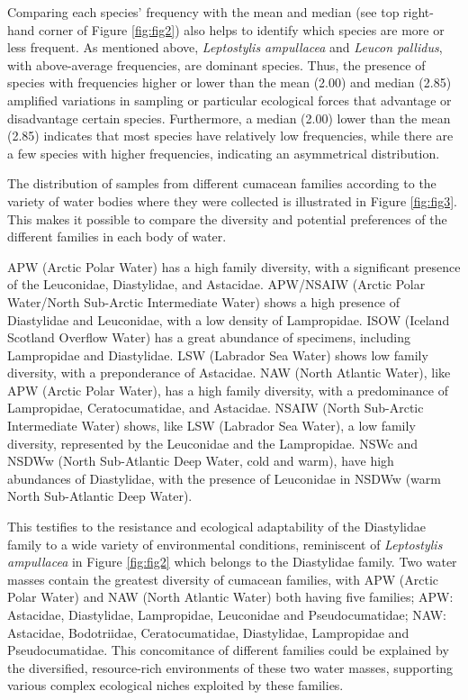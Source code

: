 Comparing each species’ frequency with the mean and median (see top right-hand corner of Figure \ref{fig:fig2}) also helps to identify which species are more or less frequent. As mentioned above, \emph{Leptostylis ampullacea} and \emph{Leucon pallidus}, with above-average frequencies, are dominant species. Thus, the presence of species with frequencies higher or lower than the mean (2.00) and median (2.85) amplified variations in sampling or particular ecological forces that advantage or disadvantage certain species. Furthermore, a median (2.00) lower than the mean (2.85) indicates that most species have relatively low frequencies, while there are a few species with higher frequencies, indicating an asymmetrical distribution.

The distribution of samples from different cumacean families according to the variety of water bodies where they were collected is illustrated in Figure \ref{fig:fig3}. This makes it possible to compare the diversity and potential preferences of the different families in each body of water.

APW (Arctic Polar Water) has a high family diversity, with a significant presence of the Leuconidae, Diastylidae, and Astacidae. APW/NSAIW (Arctic Polar Water/North Sub-Arctic Intermediate Water) shows a high presence of Diastylidae and Leuconidae, with a low density of Lampropidae. ISOW (Iceland Scotland Overflow Water) has a great abundance of specimens, including Lampropidae and Diastylidae. LSW (Labrador Sea Water) shows low family diversity, with a preponderance of Astacidae. NAW (North Atlantic Water), like APW (Arctic Polar Water), has a high family diversity, with a predominance of Lampropidae, Ceratocumatidae, and Astacidae. NSAIW (North Sub-Arctic Intermediate Water) shows, like LSW (Labrador Sea Water), a low family diversity, represented by the Leuconidae and the Lampropidae. NSWc and NSDWw (North Sub-Atlantic Deep Water, cold and warm), have high abundances of Diastylidae, with the presence of Leuconidae in NSDWw (warm North Sub-Atlantic Deep Water).

This testifies to the resistance and ecological adaptability of the Diastylidae family to a wide variety of environmental conditions, reminiscent of \emph{Leptostylis ampullacea} in Figure \ref{fig:fig2} which belongs to the Diastylidae family. Two water masses contain the greatest diversity of cumacean families, with APW (Arctic Polar Water) and NAW (North Atlantic Water) both having five families; APW: Astacidae, Diastylidae, Lampropidae, Leuconidae and Pseudocumatidae; NAW: Astacidae, Bodotriidae, Ceratocumatidae, Diastylidae, Lampropidae and Pseudocumatidae. This concomitance of different families could be explained by the diversified, resource-rich environments of these two water masses, supporting various complex ecological niches exploited by these families.

